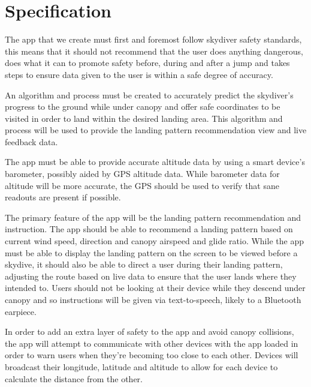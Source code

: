 \documentclass[11pt, twocolumn]{article}
\begin{document}
\section{Specification}\label{sec:specification} %

The app that we create must first and foremost follow skydiver safety standards, this means that it should not recommend that the user does anything dangerous, does what it can to promote safety before, during and after a jump and takes steps to ensure data given to the user is within a safe degree of accuracy.

An algorithm and process must be created to accurately predict the skydiver's progress to the ground while under canopy and offer safe coordinates to be visited in order to land within the desired landing area. This algorithm and process will be used to provide the landing pattern recommendation view and live feedback data.

The app must be able to provide accurate altitude data by using a smart device's barometer, possibly aided by GPS altitude data. While barometer data for altitude will be more accurate, the GPS should be used to verify that sane readouts are present if possible.

The primary feature of the app will be the landing pattern recommendation and instruction. The app should be able to recommend a landing pattern based on current wind speed, direction and canopy airspeed and glide ratio. While the app must be able to display the landing pattern on the screen to be viewed before a skydive, it should also be able to direct a user during their landing pattern, adjusting the route based on live data to ensure that the user lands where they intended to. Users should not be looking at their device while they descend under canopy and so instructions will be given via text-to-speech, likely to a Bluetooth earpiece.

In order to add an extra layer of safety to the app and avoid canopy collisions, the app will attempt to communicate with other devices with the app loaded in order to warn users when they're becoming too close to each other. Devices will broadcast their longitude, latitude and altitude to allow for each device to calculate the distance from the other.
\end{document}
